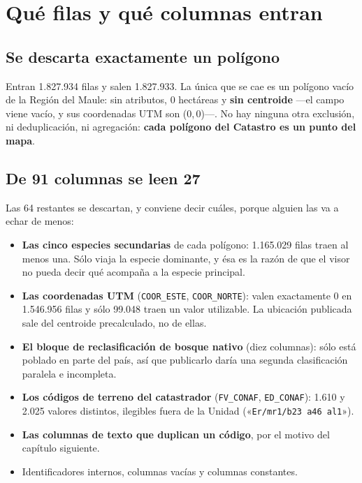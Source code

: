 \documentclass[11pt,a4paper]{report}
\newcommand{\campo}[1]{\textcolor{conaf}{\textbf{#1}}}
\newcommand{\orig}[1]{\texttt{\small #1}}
\begin{document}
\chapter{Qué filas y qué columnas entran}

\section{Se descarta exactamente un polígono}

Entran 1.827.934 filas y salen 1.827.933. La única que se cae es un polígono
vacío de la Región del Maule: sin atributos, 0 hectáreas y \campo{sin centroide}
—el campo viene vacío, y sus coordenadas UTM son (0,\,0)—. No hay ninguna otra
exclusión, ni deduplicación, ni agregación: \campo{cada polígono del Catastro es
un punto del mapa}.

\section{De 91 columnas se leen 27}

Las 64 restantes se descartan, y conviene decir cuáles, porque alguien las va a
echar de menos:

\begin{itemize}
  \item \campo{Las cinco especies secundarias} de cada polígono: 1.165.029 filas
        traen al menos una. Sólo viaja la especie dominante, y ésa es la razón
        de que el visor no pueda decir qué acompaña a la especie principal.
  \item \campo{Las coordenadas UTM} (\orig{COOR\_ESTE}, \orig{COOR\_NORTE}):
        valen exactamente 0 en 1.546.956 filas y sólo 99.048 traen un valor
        utilizable. La ubicación publicada sale del centroide precalculado, no
        de ellas.
  \item \campo{El bloque de reclasificación de bosque nativo} (diez columnas):
        sólo está poblado en parte del país, así que publicarlo daría una
        segunda clasificación paralela e incompleta.
  \item \campo{Los códigos de terreno del catastrador} (\orig{FV\_CONAF},
        \orig{ED\_CONAF}): 1.610 y 2.025 valores distintos, ilegibles fuera de la
        Unidad («\orig{Er/mr1/b23 a46 al1}»).
  \item \campo{Las columnas de texto que duplican un código}, por el motivo del
        capítulo siguiente.
  \item Identificadores internos, columnas vacías y columnas constantes.
\end{itemize}
\end{document}
